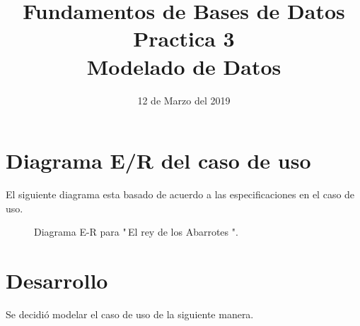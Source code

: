 \documentclass[10pt]{article}
\begin{document}
	\title{Fundamentos de Bases de Datos \\
		Practica 3\\ Modelado de Datos
	} 
	\author{}
	\date{12 de Marzo del 2019}
	\maketitle
	
	\section{Diagrama E/R del caso de uso}
	
	El siguiente diagrama esta basado de acuerdo a las especificaciones en el caso de uso.
	
	\begin{figure}[H]
		\centering
		\caption{Diagrama E-R para "\,El rey de los Abarrotes ".}
	\end{figure}
	
	
	\section{Desarrollo}
	Se decidió modelar el caso de uso de la siguiente manera.
\end{document}
